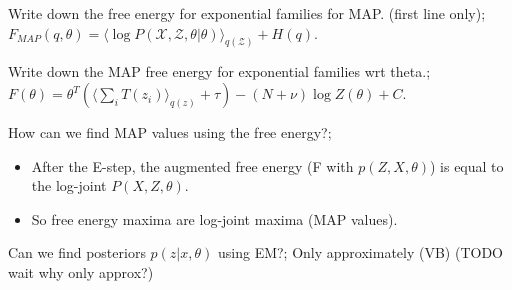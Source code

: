 \documentclass{article}
\begin{document}
Write down the free energy for exponential families for MAP. (first line only);  $F_{MAP}(q,\theta) = \langle \log P(\mathcal{X, Z, \theta}|\theta)\rangle_{q(\mathcal{Z})}+H(q)$.

Write down the MAP free energy for exponential families wrt theta.;  $F(\theta) = \theta^T(\langle \sum_i T(z_i) \rangle_{q(z)} + \tau)- (N+\nu) \log Z(\theta) + C$.

How can we find MAP values using the free energy?; \begin{itemize} \item After the E-step, the augmented free energy (F with $p(Z, X, \theta)$) is equal to the log-joint $P(X, Z, \theta)$.  \item So free energy maxima are log-joint maxima (MAP values).  \end{itemize}

Can we find posteriors $p(z|x, \theta)$ using EM?; Only approximately (VB) (TODO wait why only approx?)
\end{document}
